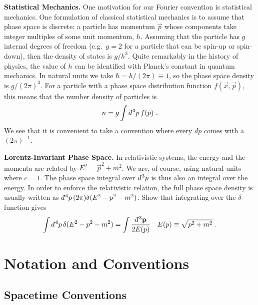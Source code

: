 \documentclass[12pt, oneside]{report}    %
\let\oldsection\section
\def\section{%
  \setcounter{sidenote}{1}%
  \oldsection
}
\begin{document}
\begin{example}
\textbf{Statistical Mechanics.} One motivation for our Fourier convention is statistical mechanics. One formulation of classical statistical mechanics is to assume that phase space is discrete: a particle has momentum $\vec{p}$ whose components take integer multiples of some unit momentum, $h$. Assuming that the particle has $g$ internal degrees of freedom (e.g.~$g=2$ for a particle that can be spin-up or spin-down), then the density of states is $g/h^{3}$. Quite remarkably in the history of physics, the value of $h$ can be identified with Planck's constant in quantum mechanics. In natural units we take $\hbar = h/(2\pi)\equiv 1$, so the phase space density is $g/(2\pi)^3$. For a particle with a phase space distribution function $f(\vec{x},\vec{p})$, this means that the number density of particles is
\begin{align}
  n = g\int \dbar^3p \, f(p) \ .
\end{align}
We see that it is convenient to take a convention where every $dp$ comes with a $(2\pi)^{-1}$.
\end{example}

\begin{exercise}\textbf{Lorentz-Invariant Phase Space.}
In relativistic systems, the energy and the momenta are related by $E^2 = \vec{p}^2 + m^2$. We are, of course, using natural units where $c=1$. The phase space integral over $\dbar^3p$ is thus also an integral over the energy. In order to enforce the relativistic relation, the full phase space density is usually written as $\dbar^4p\, (2\pi)\delta(E^2-p^2-m^2)$. Show that integrating over the $\delta$-function gives
\begin{align}
  \int \dbar^4p\, \delta(E^2-p^2-m^2) &= 
  \int \frac{\dbar^3\vec{p}}{2E(p)}
  &
  E(p) \equiv \sqrt{p^2 + m^2} \ .
\end{align}
\end{exercise}

\chapter{Notation and Conventions}


\section{Spacetime Conventions}
\label{app:spacetime:conventions}
\end{document}

